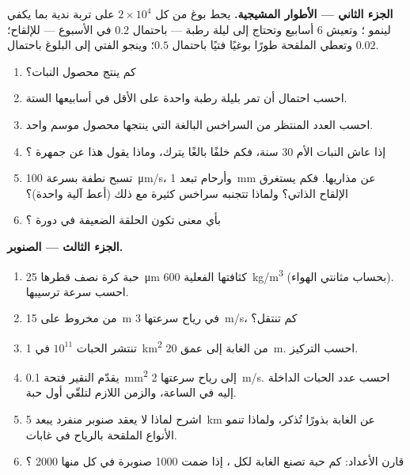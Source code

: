 \begin{problem}
\medskip
\noindent\textbf{الجزء الثاني --- الأطوار المشيجية.}
يحط بوغ من كل $2\times 10^{4}$ على تربة ندية بما يكفي لينمو
؛ وتعيش  \num{6} أسابيع وتحتاج إلى ليلة رطبة ---
باحتمال $0.2$ في الأسبوع --- للإلقاح؛ وتعطي  الملقحة طورًا
بوغيًا فتيًا باحتمال
$0.5$؛ وينجو  الفتي إلى البلوغ باحتمال
$0.02$.
\begin{enumerate}[resume]
  \item كم  ينتج محصول النبات؟
  \item احسب احتمال أن تمر  بليلة رطبة واحدة على الأقل في
        أسابيعها الستة.
  \item احسب العدد المنتظر من السراخس البالغة التي ينتجها محصول
        موسم واحد.
  \item إذا عاش النبات الأم \num{30} سنة، فكم خلفًا بالغًا يترك،
        وماذا يقول هذا عن جمهرة ؟
  \item تسبح نطفة  بسرعة \qty{100}{\micro m/s}، وأرحام 
        تبعد \qty{1}{mm} عن مذاريها. فكم يستغرق الإلقاح الذاتي؟
        ولماذا تتجنبه سراخس كثيرة مع ذلك (أعط آلية واحدة)؟
  \item بأي معنى تكون  الحلقة الضعيفة في دورة ؟
\end{enumerate}

\medskip
\noindent\textbf{الجزء الثالث ---  الصنوبر.}
\begin{enumerate}[resume]
  \item حبة  كرة نصف قطرها \qty{25}{\micro m} كثافتها الفعلية
        \qty{600}{kg/m^3} (بحساب مثانتي الهواء).
        احسب سرعة ترسيبها.
  \item من مخروط على \qty{15}{m} في رياح سرعتها \qty{3}{m/s}، كم
        تنتقل؟
  \item تنتشر الحبات $10^{11}$ في \qty{1}{km^2} من الغابة إلى عمق
        \qty{20}{m}. احسب التركيز.
  \item يقدّم النقير فتحة \qty{0.1}{mm^2} إلى رياح
        سرعتها \qty{2}{m/s}. احسب عدد الحبات الداخلة إليه في
        الساعة، والزمن اللازم لتلقّي أول حبة.
  \item اشرح لماذا لا يعقد صنوبر منفرد يبعد \qty{5}{km} عن الغابة
        بذورًا تُذكر، ولماذا تنمو الأنواع الملقحة بالرياح في غابات.
  \item قارن الأعداد: كم حبة  تصنع الغابة لكل ، إذا ضمت
        \num{1000} صنوبرة في كل منها \num{2000} ؟
\end{enumerate}


\end{problem}
